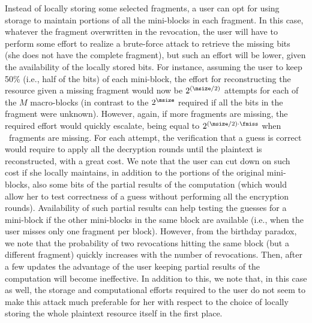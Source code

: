 \medskip
{}
Instead of locally storing some selected fragments, a user can opt for using storage to maintain portions of all the mini-blocks in each fragment. In this case, whatever the fragment overwritten in the revocation, the user will have to perform some effort to realize a brute-force attack to retrieve the missing bits (she does not have the complete fragment), but such an effort will be lower, given the availability of the locally stored bits. For instance, assuming the user to keep 50\% (i.e., half of the bits) of each mini-block, the effort for reconstructing the resource given a missing fragment would now be $2^{\tiny{(\msize/2)}}$ attempts for each of the $M$ macro-blocks (in contrast to the $2^{\tiny\msize}$ required if all the bits in the fragment were unknown). However, again, if more fragments are missing, the required effort would quickly escalate, being equal to $2^{\tiny{(\msize/2)}\cdot \fmiss}$ when \fmiss\ fragments are missing. For each attempt, the verification that a guess is correct would require to apply all the decryption rounds until the plaintext is reconstructed, with a great cost. We note that the user can cut down on such cost if she locally maintains, in addition to the portions of the original mini-blocks, also some bits of the partial results of the computation (which would allow her to test correctness of a guess without performing all the encryption rounds). Availability of such partial results can help testing the guesses for a mini-block if the other mini-blocks in the same block are available (i.e., when the user misses only one fragment per block). However, from the birthday paradox, we note that the probability of two revocations hitting the same block (but a different fragment) quickly increases with the number of revocations. Then, after a few updates the advantage of the user keeping partial results of the computation will become ineffective. In addition to this, we note that, in this case as well, the storage and computational efforts required to the user do not seem to make this attack much preferable for her with respect to the choice of locally storing the whole plaintext resource itself in the first place.


